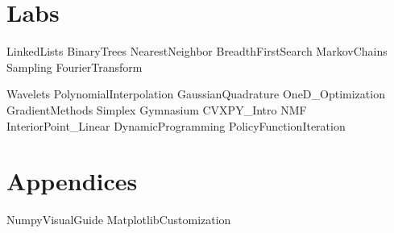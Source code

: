 \documentclass[opener-c,labs,red,nociteref]{HJnewsiambook}
\begin{document}
\part{Labs}
{LinkedLists}
{BinaryTrees}
{NearestNeighbor}
{BreadthFirstSearch}
{MarkovChains}
{Sampling}
{FourierTransform}

{Wavelets}
{PolynomialInterpolation}
{GaussianQuadrature}
{OneD_Optimization}
{GradientMethods}
{Simplex}
{Gymnasium}
{CVXPY_Intro}
{NMF}
{InteriorPoint_Linear}
{DynamicProgramming}
{PolicyFunctionIteration}

\part{Appendices}
\begin{appendices}
{NumpyVisualGuide}
{MatplotlibCustomization}
\end{appendices}



\end{document}
